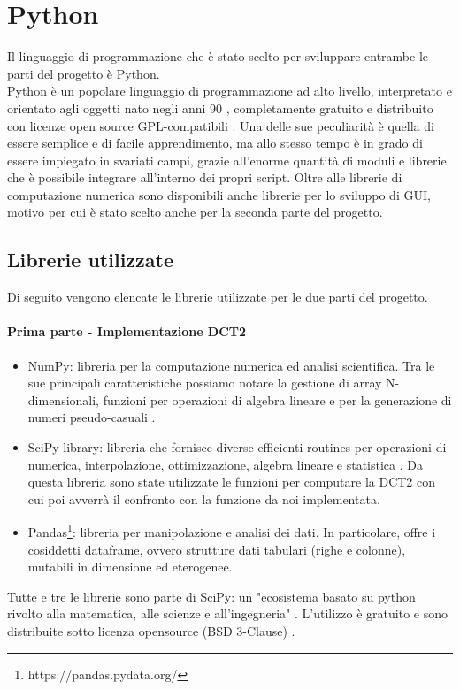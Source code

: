 \section{Python}\label{python}
Il linguaggio di programmazione che è stato scelto per sviluppare entrambe le parti del progetto è Python.\\
Python è un popolare linguaggio di programmazione ad alto livello, interpretato e orientato agli oggetti \cite{what_is_python:1} nato negli anni 90 \cite{python_history:1}, completamente gratuito e distribuito con licenze open source GPL-compatibili \cite{python_history:1}.
Una delle sue peculiarità è quella di essere semplice e di facile apprendimento, ma allo stesso tempo è in grado di essere impiegato
in svariati campi, grazie all'enorme quantità di moduli e librerie che è possibile integrare all'interno dei propri script.
Oltre alle librerie di computazione numerica sono disponibili anche librerie per lo sviluppo di GUI, motivo per cui è stato scelto anche per la seconda parte del progetto.


\subsection{Librerie utilizzate}
Di seguito vengono elencate le librerie utilizzate per le due parti del progetto.
\paragraph{Prima parte - Implementazione DCT2}
\begin{itemize}
    \item NumPy: libreria per la computazione numerica ed analisi scientifica. Tra le sue principali caratteristiche possiamo notare la gestione di array N-dimensionali, funzioni per operazioni di algebra lineare e per la generazione di numeri pseudo-casuali \cite{numpy:1}.
    \item SciPy library: libreria che fornisce diverse efficienti routines per operazioni di numerica, interpolazione, ottimizzazione, algebra lineare e statistica \cite{scipylib:1}. Da questa libreria sono state utilizzate le funzioni per computare la DCT2 con cui poi avverrà il confronto con la funzione da noi implementata.
    \item Pandas\footnote{https://pandas.pydata.org/}: libreria per manipolazione e analisi dei dati. In particolare, offre i cosiddetti dataframe, ovvero strutture dati tabulari (righe e colonne), mutabili in dimensione ed eterogenee.
\end{itemize}
Tutte e tre le librerie sono parte di SciPy: un "ecosistema basato su python rivolto alla matematica, alle scienze e all'ingegneria" \cite{scipy:1}. L'utilizzo è gratuito e sono distribuite sotto licenza opensource (BSD 3-Clause) \cite{scipy_license:1,numpy_license:1}. 
